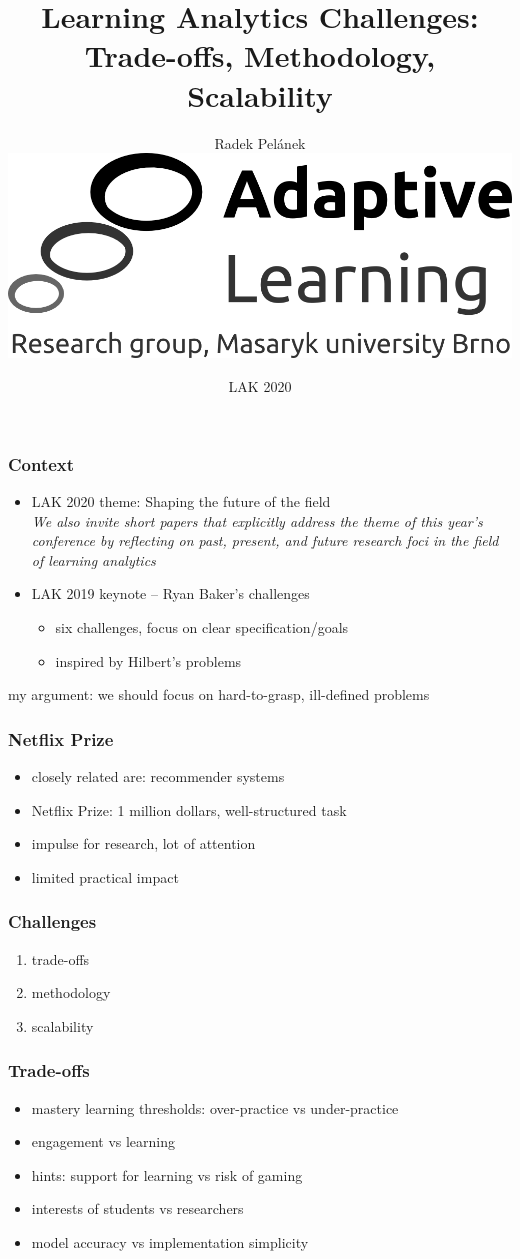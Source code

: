 \documentclass[bigger]{beamer}
\title{Learning Analytics Challenges: Trade-offs, Methodology, Scalability}
\author{Radek Pel\'anek\\[10mm]
\includegraphics[width=.3\linewidth]{al-logo}
}
\date{LAK 2020}
\begin{document}
\frame{\titlepage}

\begin{frame}
  \frametitle{Context}

  \begin{itemize}
  \item LAK 2020 theme: Shaping the future of the field\\
    {\footnotesize \emph{We also invite
      short papers that explicitly address the theme of this year’s conference
      by reflecting on past, present, and future research foci in the field of
      learning analytics}}
  \item LAK 2019 keynote -- Ryan Baker's challenges
    \begin{itemize}
    \item six challenges, focus on clear specification/goals
    \item inspired by Hilbert's problems
    \end{itemize}
  \end{itemize}

  \bigskip
  my argument: we should focus on hard-to-grasp, ill-defined problems 
\end{frame}

\begin{frame}
  \frametitle{Netflix Prize}

  \begin{itemize}
  \item closely related are: recommender systems
  \item Netflix Prize: 1 million dollars, well-structured task
  \item impulse for research, lot of attention
  \item limited practical impact
  \end{itemize}
\end{frame}

\begin{frame}
  \frametitle{Challenges}

  \begin{enumerate}
  \item trade-offs
  \item methodology
  \item scalability
  \end{enumerate}
\end{frame}

\begin{frame}
  \frametitle{Trade-offs}

  \begin{itemize}
  \item mastery learning thresholds: over-practice vs under-practice
  \item engagement vs learning
  \item hints: support for learning vs risk of gaming
  \item interests of students vs researchers
  \item model accuracy vs implementation simplicity
  \end{itemize}
\end{frame}
\end{document}
